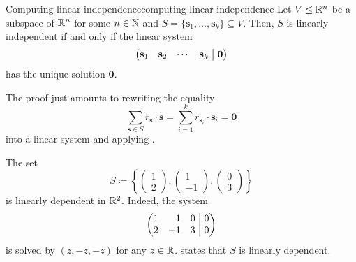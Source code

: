 \begin{corollary}{Computing linear independence}{computing-linear-independence}
 Let $V \leq \mathbb{R}^{n}$ be a subspace of $\mathbb{R}^{n}$ for some $n \in \mathbb{N}$ and $S =
 \{\mathbf{s}_1,\ldots,\mathbf{s}_k\} \subseteq V$. Then, $S$ is linearly
 independent if and only if the linear system
 \[
  \left(
   \begin{matrix*}[c]
    \mathbf{s}_1 & \mathbf{s}_2 & \cdots & \mathbf{s}_k
   \end{matrix*}
   \hspace{1mm}
  \right|
  \left.
   \begin{matrix*}[c]
    \mathbf{0}
   \end{matrix*}
  \right)
 \]
 has the unique solution $\mathbf{0}$.
\end{corollary}
\begin{corproof}
 The proof just amounts to rewriting the equality
 \[
  \sum_{\mathbf{s} \in S} r_{\mathbf{s}} \cdot \mathbf{s} = \sum_{i=1}^{k}
  r_{\mathbf{s}_i} \cdot \mathbf{s}_i = \mathbf{0}
 \]
 into a linear system and applying
 .
\end{corproof}

\begin{example}{}{}
 The set
 \[
  S \coloneqq \left\{ 
   \begin{pmatrix}
    1\\
    2
   \end{pmatrix},
   \begin{pmatrix}
    1\\
    -1
   \end{pmatrix},
   \begin{pmatrix}
    0\\
    3
   \end{pmatrix}
  \right\}
 \]
 is linearly dependent in $\mathbb{R}^2$. Indeed, the system
 \[
  \left(
   \begin{matrix*}[r]
    1 & 1 & 0\\
    2 & -1 & 3
   \end{matrix*}
   \hspace{1mm}
  \right|
  \left.
   \begin{matrix*}[r]
    0\\
    0
   \end{matrix*}
  \right)
 \]
 is solved by $(z, -z, -z)$ for any $z \in \mathbb{R}$.
  states that $S$ is
 linearly dependent.
\end{example}

